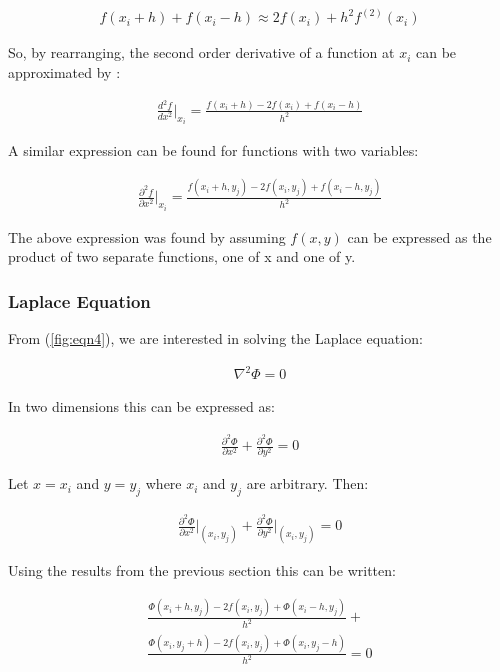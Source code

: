 \documentclass[aps,twocolumn,pre,nofootinbib,10pt]{revtex4-1}
\begin{document}
\begin{gather*}
f(x_i+h)+f(x_i-h) \approx 2f(x_i) + h^2f^{(2)}(x_i)
\end{gather*}

So, by rearranging, the second order derivative of a function at \(x_i\) can be approximated by \cite{math_meth}:

\begin{gather*}
\frac{d^2f}{dx^2}\Bigg|_{x_i} = \frac{f(x_i+h)-2f(x_i)+f(x_i-h)}{h^2}
\end{gather*}

A similar expression can be found for functions with two variables:

\begin{gather*}
\frac{\partial^2f}{\partial x^2}\Bigg|_{x_i} = \frac{f(x_i+h,y_j)-2f(x_i,y_j)+f(x_i-h,y_j)}{h^2}
\end{gather*}

The above expression was found by assuming $f(x,y)$ can be expressed as the product of two separate functions, one of x and one of y. \\


\subsubsection{Laplace Equation}

From (\ref{fig:eqn4}), we are interested in solving the Laplace equation:

\begin{gather*}
\nabla^2\Phi = 0
\end{gather*}

In two dimensions this can be expressed as:

\begin{gather*}
\frac{\partial^2\Phi}{\partial x^2} + \frac{\partial^2\Phi}{\partial y^2} = 0
\end{gather*}

Let \(x=x_i\) and \(y=y_j\) where \(x_i\) and \(y_j\) are arbitrary. Then:

\begin{gather*}
\frac{\partial^2\Phi}{\partial x^2}\Bigg|_{(x_{i},y_{j})} + \frac{\partial^2\Phi}{\partial y^2}\Bigg|_{(x_{i},y_{j})} = 0
\end{gather*}

Using the results from the previous section this can be written:

\begin{gather*}
\frac{\Phi(x_i+h,y_j)-2f(x_i,y_j)+\Phi(x_i-h,y_j)}{h^2}+ \\
\frac{\Phi(x_i,y_j+h)-2f(x_i,y_j)+\Phi(x_i,y_j-h)}{h^2}=0
\end{gather*}
\end{document}
